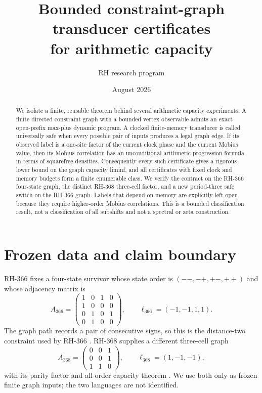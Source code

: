 \documentclass[11pt]{article}
\title{Bounded constraint-graph transducer certificates\\
for arithmetic capacity}
\author{RH research program}
\date{August 2026}
\theoremstyle{definition}
\theoremstyle{remark}
\begin{document}
\maketitle

\begin{abstract}
We isolate a finite, reusable theorem behind several arithmetic capacity
experiments.  A finite directed constraint graph with a bounded vertex
observable admits an exact open-prefix max-plus dynamic program.  A clocked
finite-memory transducer is called universally safe when every possible pair
of inputs produces a legal graph edge.  If its observed label is a one-site
factor of the current clock phase and the current Mobius value, then its
Mobius correlation has an unconditional arithmetic-progression formula in
terms of squarefree densities.  Consequently every such certificate gives a
rigorous lower bound on the graph capacity liminf, and all certificates with
fixed clock and memory budgets form a finite enumerable class.  We verify the
contract on the RH-366 four-state graph, the distinct RH-368 three-cell
factor, and a new period-three safe switch on the RH-366 graph.  Labels that
depend on memory are explicitly left open because they require higher-order
Mobius correlations.  This is a bounded classification result, not a
classification of all subshifts and not a spectral or zeta construction.
\end{abstract}

\section{Frozen data and claim boundary}

RH-366 fixes a four-state survivor whose state order is
\((--,-+,+-,++)\) and whose adjacency matrix is
\begin{equation}
A_{366}=\begin{pmatrix}
1&0&1&0\\
1&0&0&0\\
0&1&0&1\\
0&1&0&0
\end{pmatrix},
\qquad
\ell_{366}=(-1,-1,1,1).
\label{eq:rh366graph}
\end{equation}
The graph path records a pair of consecutive signs, so this is the
distance-two constraint used by RH-366 \cite{RH366}.  RH-368 supplies a
different three-cell graph
\begin{equation}
A_{368}=\begin{pmatrix}0&0&1\\0&0&1\\1&1&0\end{pmatrix},
\qquad
\ell_{368}=(1,-1,-1),
\label{eq:rh368graph}
\end{equation}
with its parity factor and all-order capacity theorem \cite{RH368}.  We use
both only as frozen finite graph inputs; the two languages are not identified.
\end{document}
